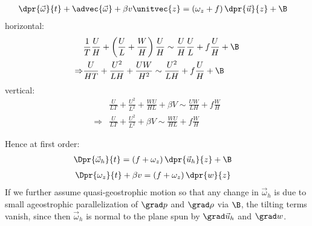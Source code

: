\begin{fullwidth}
\begin{derivationNobreak}[Vorticity]
	\begin{equation}
	\begin{split}
	\dpr{\vec{\omega} }{t}
	+
	\advec{\vec{\omega}}
	+
	\beta v \unitvec{z}
	&=
	\left(\omega_z +
	f\right) \dpr{ \vec{u}}{z}
	+
	\B
	\end{split}
	\end{equation}
	horizontal:
	\begin{equation}
		\begin{split}
	&\frac{1}{T} \frac{U}{H }
	+
	\left(\frac{U }{L} + \frac{W}{H} \right)
	\frac{U }{H}
	\sim
	\frac{U }{H} \frac{U}{L}
	+
	f \frac{U}{H}
	+
	\B \\
	\Rightarrow
	&\frac{U}{HT }
	+
	\frac{U^2 }{LH}
	+
	\frac{UW }{H^2}
	\sim
	\frac{U^2}{LH}
	+
	f \frac{U}{H}
	+
	\B
	\end{split}
	\end{equation}
	vertical:
	\begin{equation}\begin{split}
	&\frac{U}{LT}
	+
	\frac{U^2}{L^2}
	+
	\frac{W U}{ H L}
	+
	\beta V
	\sim
	\frac{UW}{LH}
	+
	f\frac{W}{H}
	\\
	\Rightarrow
	&\frac{U}{LT}
	+
	\frac{U^2}{L^2}
	+
	\beta V
	\sim
	\frac{WU}{HL}
	+
	f\frac{W}{H}
	\end{split}\end{equation}

	Hence at first order:
	\begin{equation}\begin{split}
	\Dpr{\vec{\omega}_h }{t}
	&=
	\left(f + \omega_z \right)\dpr{\vec{u}_h}{z}
	+
	\B
	\end{split}\end{equation}
	\begin{equation}\begin{split}
	\Dpr{\omega_z }{t}
	+
	\beta v
	&=
	\left(f + \omega_z \right)\dpr{w}{z}
	\end{split}\end{equation}
	If we further assume quasi-geostrophic motion so that any change in
	$\vec{\omega}_h$ is due to small ageostrophic parallelization of $\grad p$
	and	$\grad \rho$  via $\B$, the tilting terms vanish, since then
	$\vec{\omega}_h$ is normal to the plane spun by $\grad \vec{u}_h$ and
	$\grad	w$.
\end{derivationNobreak}


\end{fullwidth}
